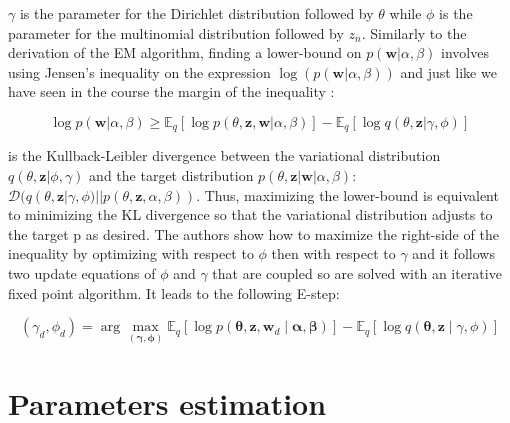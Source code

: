 \documentclass[12pt,a4paper,onecolumn]{article}
\begin{document}
$\gamma$ is the parameter for the Dirichlet distribution followed by $\theta$ while $\phi$ is the parameter for the multinomial distribution followed by $z_n$. Similarly to the derivation of the EM algorithm, finding a lower-bound on $p(\mathbf{w}|\alpha, \beta)$ involves using Jensen's inequality on the expression $\log (p(\mathbf{w}|\alpha, \beta))$ and just like we have seen in the course the margin of the inequality :

\begin{equation}
	\log p(\mathbf{w}|\alpha, \beta) \geq \mathbb{E}_q[\log p(\theta, \mathbf{z}, \mathbf{w}|\alpha, \beta)] - \mathbb{E}_q[\log q(\theta,\mathbf{z}|\gamma, \phi)] \label{eq_llh}
\end{equation}


is the Kullback-Leibler divergence between the variational distribution $q(\theta, \mathbf{z}|\phi, \gamma)$ and the target distribution $p(\theta, \mathbf{z}|\mathbf{w}|\alpha, \beta)$: $\mathcal{D}(q(\theta, \mathbf{z}|\gamma, \phi)||p(\theta, \mathbf{z}, \alpha, \beta))$. Thus, maximizing the lower-bound is equivalent to minimizing the KL divergence so that the variational distribution adjusts to the target p as desired. The authors show how to maximize the right-side of the inequality by optimizing with respect to $\phi$ then with respect to $\gamma$ and it follows two update equations of $\phi$
and $\gamma$ that are coupled so are solved with an iterative fixed point algorithm. It leads to the following E-step:

\begin{equation*}
	(\gamma_d, \phi_d) = \operatorname{arg}\max_{(\bm{\gamma}, \bm{\phi})} \mathbb{E}_{q}\left[\log p(\bm{\theta},\bm{z}, \bm{w}_d \mid \bm{\alpha}, \bm{\beta})\right] - \mathbb{E}_{q}\left[\log q(\bm{\theta}, \bm{z} \mid \gamma, \phi)\right]              \tag{E-step}
\end{equation*}


\section{Parameters estimation}

\end{document}
